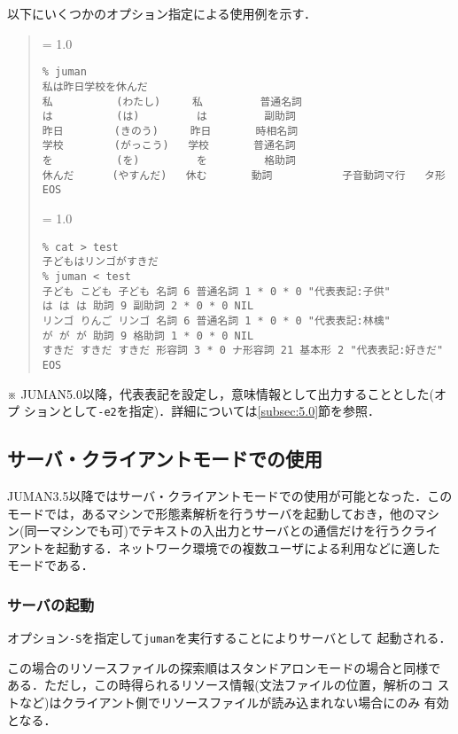 \documentclass[a4j,titlepage]{jarticle}
\begin{document}
以下にいくつかのオプション指定による使用例を示す．

\begin{quote}
{\baselineskip = 1.0 \baselineskip
\begin{verbatim}
% juman
私は昨日学校を休んだ
私          (わたし)     私         普通名詞      
は          (は)         は         副助詞        
昨日        (きのう)     昨日       時相名詞      
学校        (がっこう)   学校       普通名詞      
を          (を)         を         格助詞        
休んだ      (やすんだ)   休む       動詞           子音動詞マ行   タ形        
EOS
\end{verbatim}
}

{\baselineskip = 1.0 \baselineskip
\begin{verbatim}
% cat > test
子どもはリンゴがすきだ
% juman < test
子ども こども 子ども 名詞 6 普通名詞 1 * 0 * 0 "代表表記:子供"
は は は 助詞 9 副助詞 2 * 0 * 0 NIL
リンゴ りんご リンゴ 名詞 6 普通名詞 1 * 0 * 0 "代表表記:林檎"
が が が 助詞 9 格助詞 1 * 0 * 0 NIL
すきだ すきだ すきだ 形容詞 3 * 0 ナ形容詞 21 基本形 2 "代表表記:好きだ"
EOS
\end{verbatim}
}
\end{quote}

\noindent
※ JUMAN5.0以降，代表表記を設定し，意味情報として出力することとした(オプ
ションとして{\tt -e2}を指定)．詳細については\ref{subsec:5.0}節を参照．

\subsection{サーバ・クライアントモードでの使用}

JUMAN3.5以降ではサーバ・クライアントモードでの使用が可能となった．この
モードでは，あるマシンで形態素解析を行うサーバを起動しておき，他のマシ
ン(同一マシンでも可)でテキストの入出力とサーバとの通信だけを行うクライ
アントを起動する．ネットワーク環境での複数ユーザによる利用などに適した
モードである．

\subsubsection{サーバの起動}

オプション{\tt -S}を指定して{\tt juman}を実行することによりサーバとして
起動される．

この場合のリソースファイルの探索順はスタンドアロンモードの場合と同様で
ある．ただし，この時得られるリソース情報(文法ファイルの位置，解析のコ
ストなど)はクライアント側でリソースファイルが読み込まれない場合にのみ
有効となる．
\end{document}
